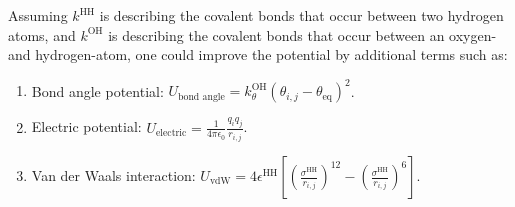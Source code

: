 \documentclass[a4paper]{article}
\begin{document}
\vspace{0.5cm}\noindent
Assuming $k^{\text{HH}}$ is describing the covalent bonds that occur between two hydrogen atoms, and $k^{\text{OH}}$ is describing the covalent bonds that occur between an oxygen- and hydrogen-atom, one could improve the potential by additional terms such as:
\begin{enumerate}
    \item Bond angle potential: $U_{\text{bond angle}} = k_{\theta}^\text{OH}\left(\theta_{i,j} - \theta_{\text{eq}}\right)^2$.
    \item Electric potential: $U_{\text{electric}} = \frac{1}{4\pi\epsilon_0}\frac{q_iq_j}{r_{i,j}}$.
    \item Van der Waals interaction: $U_{\text{vdW}} = 4\epsilon^{\text{HH}}\left[\left(\frac{\sigma^{\text{HH}}}{r_{i,j}}\right)^{12} - \left(\frac{\sigma^{\text{HH}}}{r_{i,j}}\right)^6\right]$.
\end{enumerate}
\end{document}
